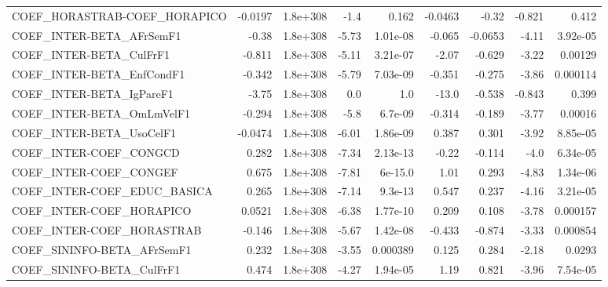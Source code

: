 \begin{tabular}{lrrrrrrrr}
COEF\_HORASTRAB-COEF\_HORAPICO          &     -0.0197 &     1.8e+308 &     -1.4 &    0.162 &    -0.0463 &       -0.32 &       -0.821 &         0.412 \\
COEF\_INTER-BETA\_AFrSemF1              &       -0.38 &     1.8e+308 &    -5.73 & 1.01e-08 &     -0.065 &     -0.0653 &        -4.11 &      3.92e-05 \\
COEF\_INTER-BETA\_CulFrF1               &      -0.811 &     1.8e+308 &    -5.11 & 3.21e-07 &      -2.07 &      -0.629 &        -3.22 &       0.00129 \\
COEF\_INTER-BETA\_EnfCondF1             &      -0.342 &     1.8e+308 &    -5.79 & 7.03e-09 &     -0.351 &      -0.275 &        -3.86 &      0.000114 \\
COEF\_INTER-BETA\_IgPareF1              &       -3.75 &     1.8e+308 &      0.0 &      1.0 &      -13.0 &      -0.538 &       -0.843 &         0.399 \\
COEF\_INTER-BETA\_OmLmVelF1             &      -0.294 &     1.8e+308 &     -5.8 &  6.7e-09 &     -0.314 &      -0.189 &        -3.77 &       0.00016 \\
COEF\_INTER-BETA\_UsoCelF1              &     -0.0474 &     1.8e+308 &    -6.01 & 1.86e-09 &      0.387 &       0.301 &        -3.92 &      8.85e-05 \\
COEF\_INTER-COEF\_CONGCD                &       0.282 &     1.8e+308 &    -7.34 & 2.13e-13 &      -0.22 &      -0.114 &         -4.0 &      6.34e-05 \\
COEF\_INTER-COEF\_CONGEF                &       0.675 &     1.8e+308 &    -7.81 &  6e-15.0 &       1.01 &       0.293 &        -4.83 &      1.34e-06 \\
COEF\_INTER-COEF\_EDUC\_BASICA           &       0.265 &     1.8e+308 &    -7.14 &  9.3e-13 &      0.547 &       0.237 &        -4.16 &      3.21e-05 \\
COEF\_INTER-COEF\_HORAPICO              &      0.0521 &     1.8e+308 &    -6.38 & 1.77e-10 &      0.209 &       0.108 &        -3.78 &      0.000157 \\
COEF\_INTER-COEF\_HORASTRAB             &      -0.146 &     1.8e+308 &    -5.67 & 1.42e-08 &     -0.433 &      -0.874 &        -3.33 &      0.000854 \\
COEF\_SININFO-BETA\_AFrSemF1            &       0.232 &     1.8e+308 &    -3.55 & 0.000389 &      0.125 &       0.284 &        -2.18 &        0.0293 \\
COEF\_SININFO-BETA\_CulFrF1             &       0.474 &     1.8e+308 &    -4.27 & 1.94e-05 &       1.19 &       0.821 &        -3.96 &      7.54e-05 \\

\end{tabular}
